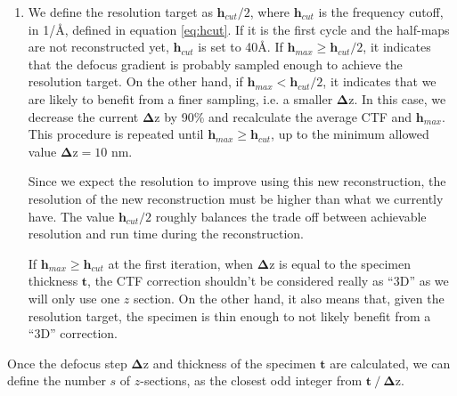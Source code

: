 \begin{enumerate}
    \item We define the resolution target as $\bm{h}_{cut}/2$, where $\bm{h}_{cut}$ is the frequency cutoff, in 1/\si{\angstrom}, defined in equation \ref{eq:hcut}. If it is the first cycle and the half-maps are not reconstructed yet, $\bm{h}_{cut}$ is set to 40\si{\angstrom}. If $\bm{h}_{max} \geqslant \bm{h}_{cut}/2$, it indicates that the defocus gradient is probably sampled enough to achieve the resolution target. On the other hand, if $\bm{h}_{max} < \bm{h}_{cut}/2$, it indicates that we are likely to benefit from a finer sampling, i.e. a smaller $\bm{\Delta \mathrm{z}}$. In this case, we decrease the current $\bm{\Delta \mathrm{z}}$ by 90\% and recalculate the average CTF and $\bm{h}_{max}$. This procedure is repeated until $\bm{h}_{max} \geqslant \bm{h}_{cut}$, up to the minimum allowed value $\bm{\Delta \mathrm{z}} = 10$ nm.
    \begin{note}Since we expect the resolution to improve using this new reconstruction, the resolution of the new reconstruction must be higher than what we currently have. The value $\bm{h}_{cut}/2$ roughly balances the trade off between achievable resolution and run time during the reconstruction.
    \end{note}
    
    \begin{note}If $\bm{h}_{max} \geqslant \bm{h}_{cut}$ at the first iteration, when $\bm{\Delta \mathrm{z}}$ is equal to the specimen thickness $\bm{t}$, the CTF correction shouldn't be considered really as ``3D'' as we will only use one $z$ section. On the other hand, it also means that, given the resolution target, the specimen is thin enough to not likely benefit from a ``3D'' correction.
    \end{note}
\end{enumerate}

Once the defocus step $\bm{\Delta \mathrm{z}}$ and thickness of the specimen $\bm{t}$ are calculated, we can define the number $s$ of $z$-sections, as the closest odd integer from $\bm{t}\ /\ \bm{\Delta \mathrm{z}}$.



